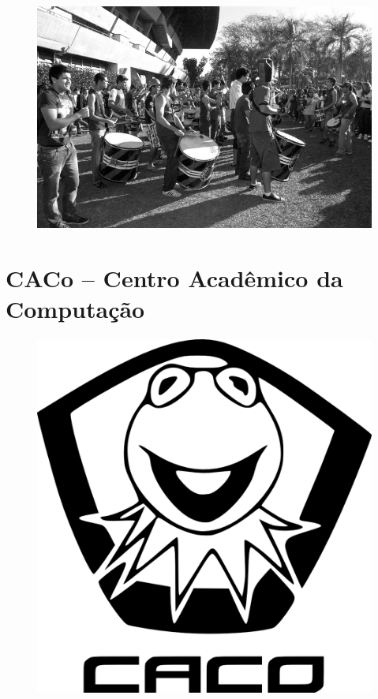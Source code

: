 \begin{figure}[H]
    \centering
    \includegraphics[scale=0.27]{img/valorosa_foto2.jpg}
\end{figure}

\newpage
\section{CACo -- Centro Acadêmico da Computação}

\begin{figure}[H]
    \centering
    \includegraphics[scale=0.37]{img/caco/logo.png}
\end{figure}

